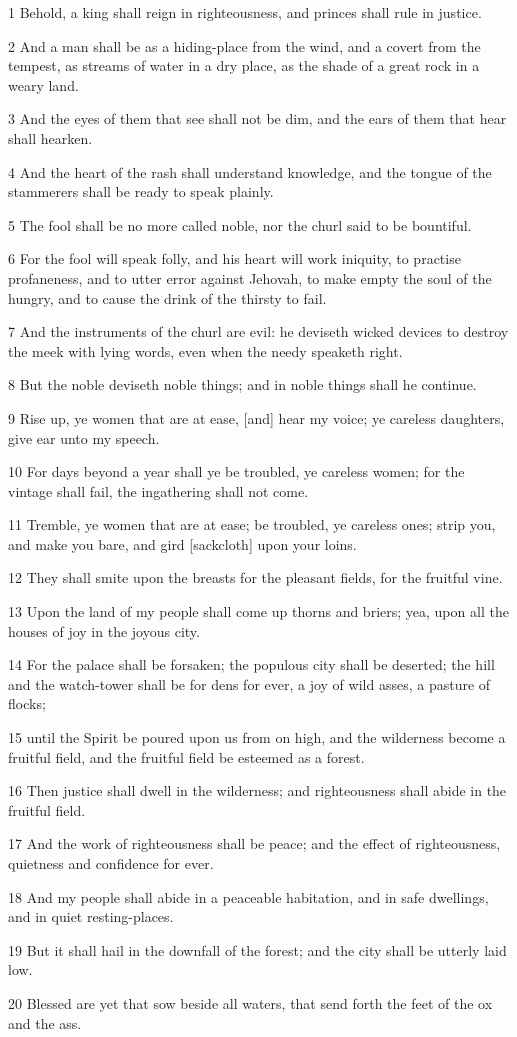 \par 1 Behold, a king shall reign in righteousness, and princes shall rule in justice.
\par 2 And a man shall be as a hiding-place from the wind, and a covert from the tempest, as streams of water in a dry place, as the shade of a great rock in a weary land.
\par 3 And the eyes of them that see shall not be dim, and the ears of them that hear shall hearken.
\par 4 And the heart of the rash shall understand knowledge, and the tongue of the stammerers shall be ready to speak plainly.
\par 5 The fool shall be no more called noble, nor the churl said to be bountiful.
\par 6 For the fool will speak folly, and his heart will work iniquity, to practise profaneness, and to utter error against Jehovah, to make empty the soul of the hungry, and to cause the drink of the thirsty to fail.
\par 7 And the instruments of the churl are evil: he deviseth wicked devices to destroy the meek with lying words, even when the needy speaketh right.
\par 8 But the noble deviseth noble things; and in noble things shall he continue.
\par 9 Rise up, ye women that are at ease, [and] hear my voice; ye careless daughters, give ear unto my speech.
\par 10 For days beyond a year shall ye be troubled, ye careless women; for the vintage shall fail, the ingathering shall not come.
\par 11 Tremble, ye women that are at ease; be troubled, ye careless ones; strip you, and make you bare, and gird [sackcloth] upon your loins.
\par 12 They shall smite upon the breasts for the pleasant fields, for the fruitful vine.
\par 13 Upon the land of my people shall come up thorns and briers; yea, upon all the houses of joy in the joyous city.
\par 14 For the palace shall be forsaken; the populous city shall be deserted; the hill and the watch-tower shall be for dens for ever, a joy of wild asses, a pasture of flocks;
\par 15 until the Spirit be poured upon us from on high, and the wilderness become a fruitful field, and the fruitful field be esteemed as a forest.
\par 16 Then justice shall dwell in the wilderness; and righteousness shall abide in the fruitful field.
\par 17 And the work of righteousness shall be peace; and the effect of righteousness, quietness and confidence for ever.
\par 18 And my people shall abide in a peaceable habitation, and in safe dwellings, and in quiet resting-places.
\par 19 But it shall hail in the downfall of the forest; and the city shall be utterly laid low.
\par 20 Blessed are yet that sow beside all waters, that send forth the feet of the ox and the ass.


